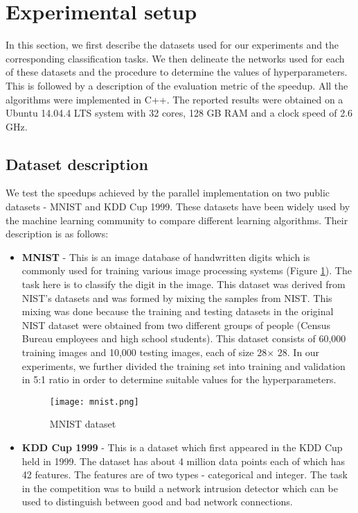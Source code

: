 \section{Experimental setup}
\label{Exp}
In this section, we first describe the datasets used for our experiments and the corresponding classification tasks. We then delineate the networks used for each of these datasets and the procedure to determine the values of hyperparameters. This is followed by a description of the evaluation metric of the speedup. All the algorithms were implemented in C++. The reported results were obtained on a Ubuntu 14.04.4 LTS system with 32 cores, 128 GB RAM and a clock speed of 2.6 GHz.  

\subsection{Dataset description}
\label{sub:data_desc}
We test the speedups achieved by the parallel implementation on two public datasets - MNIST and KDD Cup 1999. These datasets have been widely used by the machine learning community to compare different learning algorithms. Their description is as follows:

\begin{itemize}
\item \textbf{MNIST} - This is an image database of handwritten digits which is commonly used for training various image processing systems (Figure \ref{fig:mnist}). The task here is to classify the digit in the image. This dataset was derived from NIST's datasets and was formed by mixing the samples from NIST. This mixing was done because the training and testing datasets in the original NIST dataset were obtained from two different groups of people (Census Bureau employees and high school students). This dataset consists of 60,000 training images and 10,000 testing images, each of size 28$\times$ 28. In our experiments, we further divided the training set into training and validation in 5:1 ratio in order to determine suitable values for the hyperparameters.

\begin{figure}
  \centering
       \texttt{[image: mnist.png]}
  \caption{MNIST dataset}
  \label{fig:mnist}
\end{figure}

\item \textbf{KDD Cup 1999} -  This is a dataset which first appeared in the KDD Cup held in 1999. The dataset has about 4 million data points each of which has 42 features. The features are of two types - categorical and integer. The task in the competition was to build a network intrusion detector which can be used to distinguish between good and bad network connections. 
\end{itemize}

